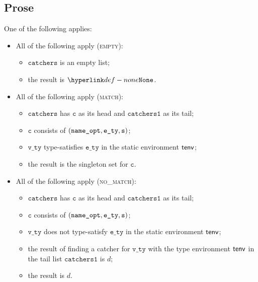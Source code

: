 \documentclass{book}
\newcommand\vc[0]{\texttt{c}}
\newcommand\vs[0]{\texttt{s}}
\newcommand\catchers[0]{\texttt{catchers}}
\newcommand\catchersone[0]{\texttt{catchers1}}
\newcommand\ety[0]{\texttt{e\_ty}}
\newcommand\vvty[0]{\texttt{v\_ty}}
\begin{document}
\subsection{Prose}
One of the following applies:
\begin{itemize}
  \item All of the following apply (\textsc{empty}):
  \begin{itemize}
    \item $\catchers$ is an empty list;
    \item the result is $\None$.
  \end{itemize}

  \item All of the following apply (\textsc{match}):
  \begin{itemize}
    \item $\catchers$ has $\vc$ as its head and $\catchersone$ as its tail;
    \item $\vc$ consists of $(\nameopt, \ety, \vs)$;
    \item $\vvty$ type-satisfies $\ety$ in the static environment $\textsf{tenv}$;
    \item the result is the singleton set for $\vc$.
  \end{itemize}

  \item All of the following apply (\textsc{no\_match}):
  \begin{itemize}
    \item $\catchers$ has $\vc$ as its head and $\catchersone$ as its tail;
    \item $\vc$ consists of $(\nameopt, \ety, \vs)$;
    \item $\vvty$ does not type-satisfy $\ety$ in the static environment $\textsf{tenv}$;
    \item the result of finding a catcher for $\vvty$ with the type environment $\textsf{tenv}$ in the tail list $\catchersone$
    is $d$;
    \item the result is $d$.
  \end{itemize}
\end{itemize}


\end{document}
